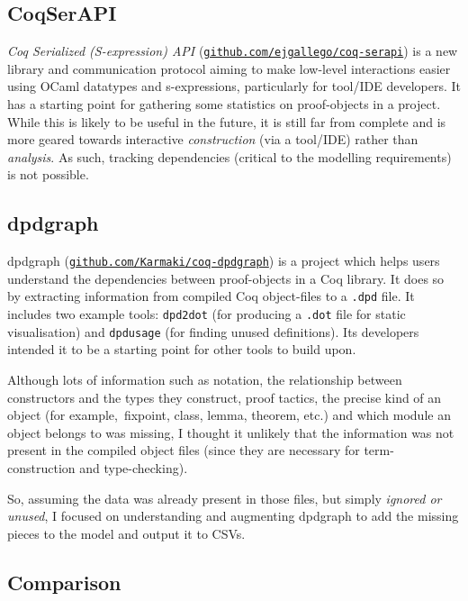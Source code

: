 \subsection{CoqSerAPI}

\emph{Coq Serialized (S-expression) API}
(\href{http://github.com/ejgallego/coq-serapi}{\texttt{github.com/ejgallego/coq-serapi}})
is a new library and communication protocol aiming to make low-level
interactions easier using OCaml datatypes and s-expressions, particularly for
tool/IDE developers. It has a starting point for gathering some statistics on
proof-objects in a project. While this is likely to be useful in the future, it
is still far from complete and is more geared towards interactive
\emph{construction} (via a tool/IDE) rather than \emph{analysis}. As such,
tracking dependencies (critical to the modelling requirements) is not possible.

\subsection{dpdgraph}

dpdgraph
(\href{http://github.com/Karmaki/coq-dpdgraph}{\texttt{github.com/Karmaki/coq-dpdgraph}})
is a project which helps users understand the dependencies between proof-objects
in a Coq library. It does so by extracting information from compiled Coq
object-files to a \texttt{.dpd} file. It includes two example tools:
\texttt{dpd2dot} (for producing a \texttt{.dot} file for static visualisation)
and \texttt{dpdusage} (for finding unused definitions). Its developers intended
it to be a starting point for other tools to build upon.

Although lots of information such as notation, the relationship between
constructors and the types they construct, proof tactics, the precise kind of an
object (for example,\  fixpoint, class, lemma, theorem, etc.) and which module an object
belongs to was missing, I thought it unlikely that the information was not
present in the compiled object files (since they are necessary for
term-construction and type-checking).

So, assuming the data was already present in those files, but simply
\emph{ignored or unused}, I focused on understanding and augmenting dpdgraph to
add the missing pieces to the model and output it to CSVs.

\subsection{Comparison}\label{subsec:comparison}

